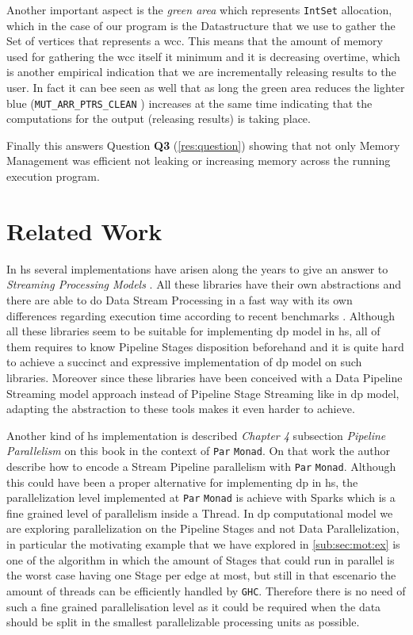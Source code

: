 \documentclass[preprint]{elsarticle}
\begin{document}
Another important aspect is the \textit{green area} which represents \texttt{IntSet} allocation, which in the case of our program is the Datastructure that we use to gather the Set of vertices that represents a \acrshort{wcc}. This means that the amount of memory used for gathering the \acrshort{wcc} itself it minimum and it is decreasing overtime, which is another empirical indication that we are incrementally releasing results to the user. In fact it can bee seen as well that as long the green area reduces the lighter blue (\texttt{MUT_ARR_PTRS_CLEAN} \cite{ghcheap}) increases at the same time indicating that the computations for the output (releasing results) is taking place. 

Finally this answers Question \textbf{Q3} (\autoref{res:question}) showing that not only Memory Management was efficient not leaking or increasing memory across the running execution program.

\section{Related Work}
In \acrfull{hs} several implementations have arisen along the years to give an answer to \emph{Streaming Processing Models} \cite{pipes, conduit, streamly}. All these libraries have their own abstractions and there are able to do Data Stream Processing in a fast way with its own differences regarding execution time according to recent benchmarks \cite{benchstreamhs}. Although all these libraries seem to be suitable for implementing \acrshort{dp} model in \acrshort{hs}, all of them requires to know Pipeline Stages disposition beforehand and it is quite hard to achieve a succinct and expressive implementation of \acrshort{dp} model on such libraries. Moreover since these libraries have been conceived with a Data Pipeline Streaming model approach instead of Pipeline Stage Streaming like in \acrshort{dp} model, adapting the abstraction to these tools makes it even harder to achieve.

Another kind of \acrshort{hs} implementation is described \emph{Chapter 4} subsection \emph{Pipeline Parallelism} on this book \cite{parallelbook} in the context of \texttt{Par} \texttt{Monad}. On that work the author describe how to encode a Stream Pipeline parallelism with \texttt{Par} \texttt{Monad}. Although this could have been a proper alternative for implementing \acrshort{dp} in \acrshort{hs}, the parallelization level implemented at \texttt{Par} \texttt{Monad} is achieve with Sparks \citep{sparks} which is a fine grained level of parallelism inside a Thread. In \acrshort{dp} computational model we are exploring parallelization on the Pipeline Stages and not Data Parallelization, in particular the motivating example that we have explored in \autoref{sub:sec:mot:ex} is one of the algorithm in which the amount of Stages that could run in parallel is the worst case having one Stage per edge at most, but still in that escenario the amount of threads can be efficiently handled by \texttt{GHC}. Therefore there is no need of such a fine grained parallelisation level as it could be required when the data should be split in the smallest parallelizable processing units as possible. 
\end{document}
